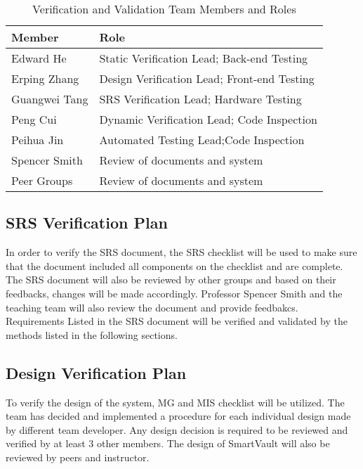\documentclass[12pt, titlepage]{article}
\begin{document}
\begin{table}[h]
\begin{center}
\begin{tabular}{|l | l|}
\hline
  \textbf{Member} & \textbf{Role}\\
  \hline
  Edward He & Static Verification Lead; Back-end Testing\\
  \hline
  Erping Zhang & Design Verification Lead; Front-end Testing \\
  \hline
  Guangwei Tang & SRS Verification Lead; Hardware Testing\\
  \hline
  Peng Cui & Dynamic Verification Lead; Code Inspection\\
  \hline
  Peihua Jin & Automated Testing Lead;Code Inspection\\
  \hline
  Spencer Smith & Review of documents and system\\
  \hline
  Peer Groups & Review of documents and system\\
  \hline
\end{tabular}
\end{center}
\caption{Verification and Validation Team Members and Roles}            

\end{table}
\break
\subsection{SRS Verification Plan}

In order to verify the SRS document, the SRS checklist will be used to make sure that the document included all components on the checklist and are complete. The SRS document will also be reviewed by other groups and based on their feedbacks, changes will be made accordingly. Professor Spencer Smith and the teaching team will also review the document and provide feedbakcs. Requirements Listed in the SRS document will be verified and validated by the methods listed in the following sections.



\subsection{Design Verification Plan}

To verify the design of the system, MG and MIS checklist will be utilized. The team has decided and implemented a procedure for each individual design made by different team developer. Any design decision is required to be reviewed and verified by at least 3 other members. The design of SmartVault will also be reviewed by peers and instructor. 
\end{document}
